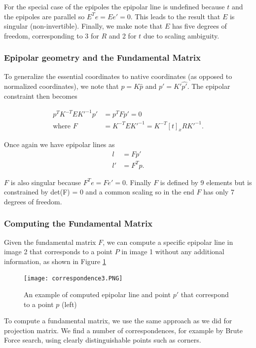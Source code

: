 \documentclass[twoside]{article}
\begin{document}
For the special case of the epipoles the epipolar line is undefined because $t$ and the epipoles are parallel so $E^Te = Ee' = 0$. This leads to the result that $E$ is singular (non-invertible). Finally, we make note that $E$ has five degrees of freedom, corresponding to 3 for $R$ and 2 for $t$ due to scaling ambiguity.

\subsubsection{Epipolar geometry and the Fundamental Matrix \cite{FP}}

To generalize the essential coordinates to native coordinates (as opposed to normalized coordinates), we note that $p = K\hat{p}$ and $p' = K'\hat{p'}$. The epipolar constraint then becomes

\begin{align}
p^TK^{-T}EK'^{-1}p' &= p^T F p' = 0 \\
\text{where } F &= K^{-T}E K'^{-1} = K^{-T}[t]_x R K'^{-1}.
\end{align}

Once again we have epipolar lines as
\begin{align}
l &= Fp' \\
l' &= F^Tp.
\end{align}

$F$ is also singular because $F^Te = Fe' = 0$. Finally $F$ is defined by 9 elements but is constrained by det(F) = 0 and a common scaling so in the end $F$ has only 7 degrees of freedom.

\subsubsection{Computing the Fundamental Matrix}

Given the fundamental matrix $F$, we can compute a specific epipolar line in image 2 that corresponds to a point $P$ in image 1 without any additional information, as shown in Figure \ref{ex2}

\begin{figure}[h!]
  \begin{center}
	\texttt{[image: correspondence3.PNG]}  \end{center}
  \caption{An example of computed epipolar line and point $p'$ that correspond to a point $p$ (left)}
  \label{ex2}
\end{figure}

To compute a fundamental matrix, we use the same approach as we did for projection matrix. We find a number of correspondences, for example by Brute Force search, using clearly distinguishable points such as corners.
\end{document}
